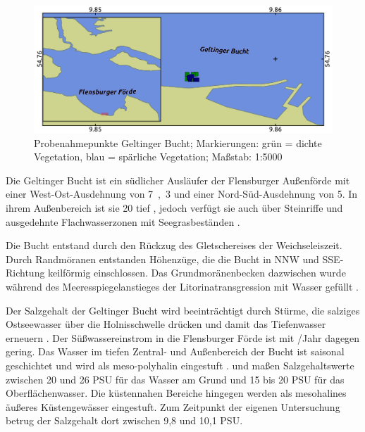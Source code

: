 \begin{figure}[htb]
\centering
\includegraphics[width=1\textwidth]{images/GB.png}
\caption[Probenahmepunkte Geltinger Bucht]{Probenahmepunkte Geltinger Bucht; Markierungen: grün = dichte Vegetation, blau = spärliche Vegetation; Maßstab: 1:5000}
\label{GB}
\end{figure}


Die Geltinger Bucht ist ein südlicher Ausläufer der Flensburger Außenförde mit einer West-Ost-Ausdehnung von \unit{7,3}{\kilo\metre} und einer Nord-Süd-Ausdehnung von \unit{5}{\kilo\metre}. In ihrem Außenbereich ist sie \unit{20}{\metre} tief \citep{nikulina_2009}, jedoch verfügt sie auch über Steinriffe und ausgedehnte Flachwasserzonen mit Seegrasbeständen \citep{landesbetriebfurkustenschutznationalparkundmeeresschutzschleswig-holstein_2013}.

Die Bucht entstand durch den Rückzug des Gletschereises der Weichseleiszeit. Durch Randmöranen entstanden Höhenzüge, die die Bucht in NNW und SSE-Richtung keilförmig einschlossen. Das Grundmoränenbecken dazwischen wurde während des Meeresspiegelanstieges der Litorinatransgression mit Wasser gefüllt \citep{reisch_1997}.

Der Salzgehalt der Geltinger Bucht wird beeinträchtigt durch Stürme, die salziges Ostseewasser über die Holnisschwelle drücken und damit das Tiefenwasser erneuern \citep{nikulina_2009}. Der Süßwassereinstrom  in die Flensburger Förde ist mit \unit{}{\kilo\cubic\metre}/Jahr \citep{lanu_2001} dagegen gering.
Das Wasser im tiefen Zentral- und Außenbereich der Bucht ist saisonal geschichtet und wird als meso-polyhalin eingestuft \citep{reimers_2005}. \cite{kandler_1963,exon_1972} und \cite{bluhm_1990} maßen Salzgehaltswerte zwischen 20 und 26 PSU für das Wasser am Grund und 15 bis 20 PSU für das Oberflächenwasser. Die küstennahen Bereiche hingegen werden als mesohalines äußeres Küstengewässer eingestuft. Zum Zeitpunkt der eigenen Untersuchung betrug der Salzgehalt dort zwischen 9,8 und 10,1 PSU.

